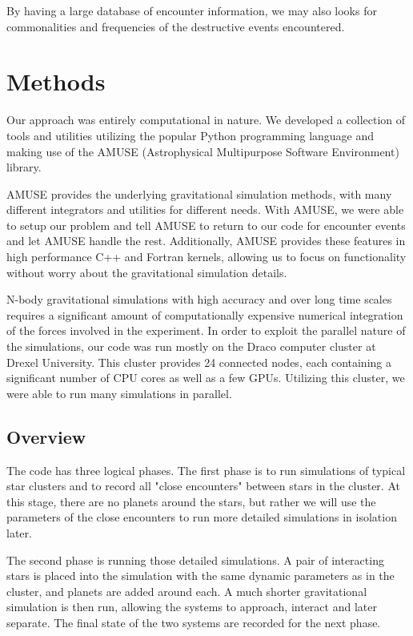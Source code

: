 \documentclass[12pt]{article}
\begin{document}
By having a large database of encounter information, we may also looks for commonalities
and frequencies of the destructive events encountered. 


\section{Methods}

    Our approach was entirely computational in nature. We developed a collection of tools
    and utilities utilizing the popular Python programming language and making use
    of the AMUSE (Astrophysical Multipurpose Software Environment) library. 

    AMUSE provides the underlying gravitational simulation methods, with many different
    integrators and utilities for different needs. With AMUSE, we were able to 
    setup our problem and tell AMUSE to return to our code for encounter events and
    let AMUSE handle the rest. Additionally, AMUSE provides these features in high
    performance C++ and Fortran kernels, allowing us to focus on functionality without
    worry about the gravitational simulation details.

    N-body gravitational simulations with high accuracy and over long time scales requires
    a significant amount of computationally expensive numerical integration of the 
    forces involved in the experiment. In order to exploit the parallel nature of 
    the simulations, our code was run mostly on the Draco computer 
    cluster at Drexel University. This cluster provides 24 connected nodes, each containing
    a significant number of CPU cores as well as a few GPUs. Utilizing this cluster,
    we were able to run many simulations in parallel.

    \subsection{Overview}

    The code has three logical phases. The first phase is to run simulations of typical
    star clusters and to record all "close encounters" between stars in the cluster.
    At this stage, there are no planets around the stars, but rather we will use the
    parameters of the close encounters to run more detailed simulations in isolation
    later.

    The second phase is running those detailed simulations. A pair of interacting stars
    is placed into the simulation with the same dynamic parameters as in the cluster,
    and planets are added around each. A much shorter gravitational simulation is then
    run, allowing the systems to approach, interact and later separate. The final
    state of the two systems are recorded for the next phase.
\end{document}
